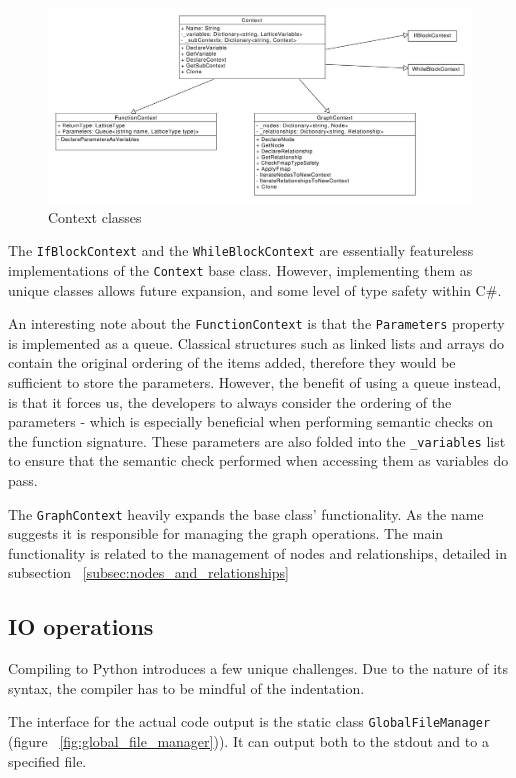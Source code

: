 \begin{figure}[H]
    \centering
    \includegraphics[width=12cm]{figures/implementation_section/contexts}
    \caption{Context classes}
    \label{fig:contexts}
\end{figure}

The \lstinline{IfBlockContext} and the \lstinline{WhileBlockContext} are essentially featureless implementations
of the \lstinline{Context} base class.
However, implementing them as unique classes allows future expansion, and some level of type safety within C#.

An interesting note about the \lstinline{FunctionContext} is that the \lstinline{Parameters} property is implemented
as a queue.
Classical structures such as linked lists and arrays do contain the original ordering of the items added,
therefore they would be sufficient to store the parameters.
However, the benefit of using a queue instead, is that it forces us, the developers to always consider the ordering of
the parameters - which is especially beneficial when performing semantic checks on the function signature.
These parameters are also folded into the \lstinline{_variables} list to ensure that the semantic check performed
when accessing them as variables do pass.

The \lstinline{GraphContext} heavily expands the base class' functionality.
As the name suggests it is responsible for managing the graph operations.
The main functionality is related to the management of nodes and relationships, detailed in subsection ~\ref{subsec:nodes_and_relationships}

\subsection{IO operations}
Compiling to Python introduces a few unique challenges.
Due to the nature of its syntax, the compiler has to be mindful of the indentation.

The interface for the actual code output is the static class \lstinline{GlobalFileManager} (figure ~\ref{fig:global_file_manager})).
It can output both to the stdout and to a specified file.


